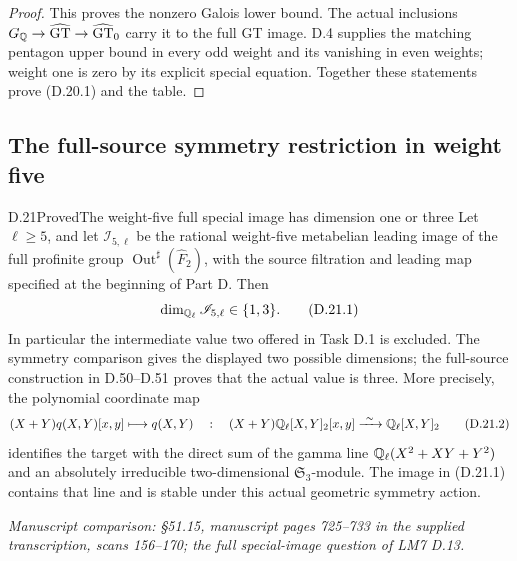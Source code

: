 \begin{proof}
This proves the nonzero Galois lower bound. The actual
inclusions $G_\mathbb Q\to\widehat{\rm GT}\to
\widehat{\rm GT}_0$ carry it to the full GT image.
D.4 supplies the matching pentagon upper bound in
every odd weight and its vanishing in even weights;
weight one is zero by its explicit special equation.
Together these statements prove (D.20.1) and the table.
\end{proof}
\subsection{The full-source symmetry restriction in weight five}

\begin{statement}{D.21}{Proved}{The weight-five full special image has dimension one or three}
Let $\ell\ge5$, and let $\mathscr I_{5,\ell}$ be the rational
weight-five metabelian leading image of the full profinite group
$\operatorname{Out}^{\sharp}(\widehat F_2)$, with the source
filtration and leading map specified at the beginning of Part D.
Then
\[
             \dim_{\mathbb Q_\ell}\mathscr I_{5,\ell}\in\{1,3\}.
             \tag{D.21.1}
\]
In particular the intermediate value two offered in Task D.1 is
excluded. The symmetry comparison gives the displayed two possible
dimensions; the full-source construction in D.50--D.51 proves
that the actual value is three.
More precisely, the polynomial coordinate map
\[
 (X+Y)q(X,Y)[x,y]\longmapsto q(X,Y)
 \quad:\quad
 (X+Y)\mathbb Q_\ell[X,Y]_2[x,y]\xrightarrow{\ \sim\ }
                    \mathbb Q_\ell[X,Y]_2
 \tag{D.21.2}
\]
identifies the target with the direct sum of the gamma line
$\mathbb Q_\ell(X^2+XY+Y^2)$ and an absolutely irreducible
two-dimensional $\mathfrak S_3$-module. The image in
(D.21.1) contains that line and is stable under this actual
geometric symmetry action.
\par\smallskip\noindent\emph{Manuscript comparison: \S51.15,
manuscript pages 725--733 in the supplied transcription,
scans 156--170; the full special-image question of LM7 D.13.}
\end{statement}
